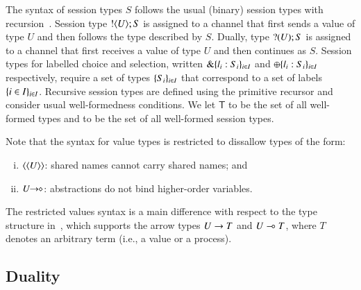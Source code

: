 The syntax of session types $S$ follows the usual (binary) session
types with recursion~\cite{honda.vasconcelos.kubo:language-primitives,GH05}.
Session type $! \langle U \rangle ; S$ is assigned to a channel that first sends a 
value of type $U$ and then follows
the type described by $S$.
Dually, type $? (U) ; S$ is assigned to a channel  
that first receives a value of type $U$ and then continues as $S$. 
Session types for labelled choice and selection, 
written $\& \{l_i:S_i\}_{i \in I}$ and $\oplus \{l_i:S_i\}_{i \in I}$ respectively,
require a set of types $\{S_i\}_{i \in I}$ that correspond to a set of
labels $\{i \in I\}_{i \in I}$. 
Recursive session types are defined using the primitive recursor
and consider usual well-formedness conditions.
We let $\mathsf{T}$ to be the set of all well-formed types and
\ST to be the set of all well-formed session types.


Note that the syntax for value types is restricted
to dissallow types of the form:
\begin{enumerate}[i)]
	\item	$\langle \langle U \rangle \rangle$: shared names
		cannot carry shared names; and

	\item  $U\!\! \rightarrow\!\! \diamond$: abstractions do not
		bind higher-order variables.
\end{enumerate}


The restricted values syntax is a main difference with respect to
the type structure  in~\cite{tlca07}, which 
supports the arrow types $U \rightarrow T$ and 
$U \multimap T$, where $T$ denotes an arbitrary term 
(i.e., a value or a process).


\subsection{Duality}

